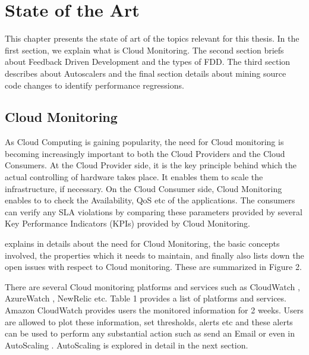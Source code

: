 \documentclass[article,type=msc,colorback,12pt,accentcolor=tud7b]{tudthesis}
\begin{document}

	\cleardoublepage

 \section{State of the Art}
 	
	This chapter presents the state of art of the topics relevant for this thesis. In the first section, we explain what is Cloud Monitoring. The second section briefs about Feedback Driven Development and the types of FDD. The third section describes about Autoscalers and the final section details about mining source code changes to identify performance regressions. 
	
	\subsection{Cloud Monitoring}
 	
 	As Cloud Computing is gaining popularity, the need for Cloud monitoring is becoming increasingly important to  both the Cloud Providers and the Cloud Consumers. At the Cloud Provider side, it is the key principle behind which the actual controlling of hardware takes place. It enables them to scale the infrastructure, if necessary. On the Cloud Consumer side, Cloud Monitoring enables to to check the Availability, QoS etc of the applications. The consumers can verify any SLA violations by comparing these parameters provided by several Key Performance Indicators (KPIs) provided by Cloud Monitoring.
 	
 	\cite{aceto2013cloud} explains in details about the need for Cloud Monitoring, the basic concepts involved, the properties which it needs to maintain, and finally also lists down the open issues with respect to Cloud monitoring. These are summarized in Figure 2.
	
	There are several Cloud monitoring platforms and services such as CloudWatch \cite{cloudwatchdev} \cite{cloudwatch}, AzureWatch \cite{azurewatch} , NewRelic \cite{newrelic} etc. Table 1 provides a list of platforms and services. Amazon CloudWatch provides users the monitored information for 2 weeks. Users are allowed to plot these information, set thresholds, alerts etc and these alerts can be used to perform any substantial action such as send an Email or even in AutoScaling \cite{aas}. AutoScaling is explored in detail in the next section. 
	
\end{document}
